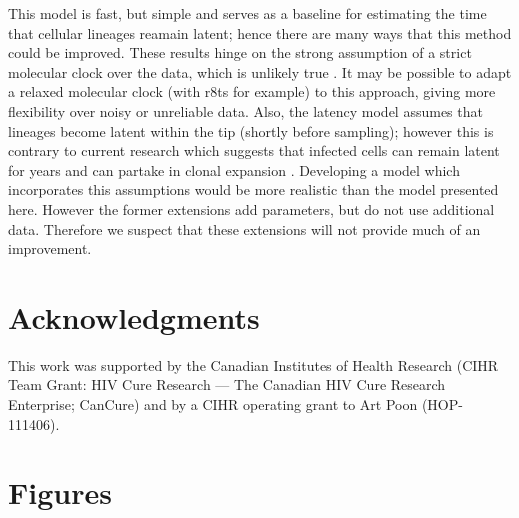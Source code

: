 \documentclass[12pt]{article}
\begin{document}
This model is fast, but simple and serves as a baseline for estimating the time that cellular lineages reamain latent; hence there are many ways that this method could be improved.
These results hinge on the strong assumption of a strict molecular clock over the data, which is unlikely true \citep{Shankarappa99}. 
It may be possible to adapt a relaxed molecular clock (with r8ts \citep{r8ts} for example) to this approach, giving more flexibility over noisy or unreliable data.
Also, the latency model assumes that lineages become latent within the tip (shortly before sampling); however this is contrary to current research which suggests that infected cells can remain latent for years and can partake in clonal expansion \citep{Maldarelli14}.
Developing a model which incorporates this assumptions
would be more realistic than the model presented here.
However the former extensions add parameters, but do not use additional data.
Therefore we suspect that these extensions will not provide much of an improvement.



\section * {Acknowledgments} \label{sec:ackn}
This work was supported by the Canadian Institutes of Health Research (CIHR Team Grant: HIV Cure Research --- The Canadian HIV Cure Research Enterprise; CanCure) and by a CIHR operating grant to Art Poon (HOP-111406).

\clearpage





\clearpage


\section * {Figures}
\end{document}
